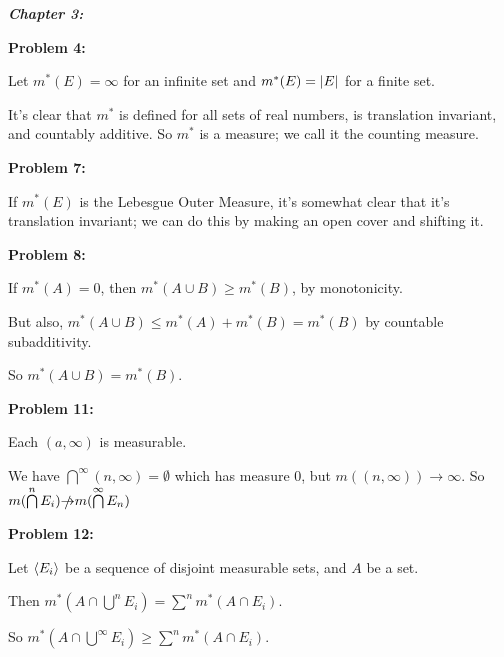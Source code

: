 \documentclass[a4paper,12pt]{article}
\begin{document}


{\Huge{\textit{\textbf{Chapter 3:}}}}

\shunt

{\bf Problem 4:}

Let $m^*(E) = \infty$ for an infinite set and $m^*(E) = \left\lvert E \right\rvert$ for a finite set.

It's clear that $m^*$ is defined for all sets of real numbers, is translation invariant, and countably additive. So $m^*$ is a measure; we call it the counting measure.

\shunt

{\bf Problem 7:}

If $m^*(E)$ is the Lebesgue Outer Measure, it's somewhat clear that it's translation invariant; we can do this by making an open cover and shifting it.

\shunt

{\bf Problem 8:}

If $m^*(A) = 0$, then $m^*(A \cup B) \geq m^*(B)$, by monotonicity.

But also, $m^*(A \cup B) \leq m^*(A) + m^*(B) = m^*(B)$ by countable subadditivity. 

So $m^*(A \cup B) = m^*(B)$.

\shunt

{\bf Problem 11:}

Each $(a, \infty)$ is measurable.

We have $\bigcap\limits^\infty (n, \infty) = \emptyset$ which has measure $0$, but $m((n, \infty)) \to \infty$. So $m(\bigcap\limits^n E_i) \slashed{\to} m(\bigcap\limits^\infty E_n)$

\shunt

{\bf Problem 12:}

Let $\left\langle E_i \right\rangle$ be a sequence of disjoint measurable sets, and $A$ be a set.

Then $m^*(A \cap \bigcup\limits^n E_i) = \sum\limits^n m^*(A \cap E_i)$.

So $m^*(A \cap \bigcup\limits^\infty E_i) \geq \sum\limits^n m^*(A \cap E_i)$.
\end{document}
